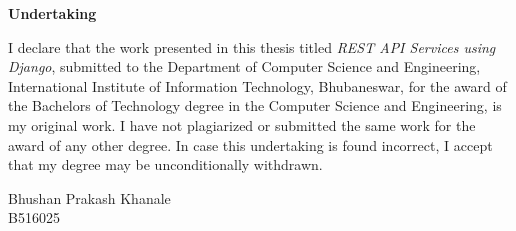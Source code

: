\centerline{\Large{\bf Undertaking}}
\vspace{1cm}

\noindent
I declare that the work presented in this thesis titled
\textit{REST API Services using Django}, submitted to the Department of
Computer Science and Engineering, International Institute of Information
Technology, Bhubaneswar, for the award of the Bachelors of Technology degree
in the Computer Science and Engineering, is my original work. I have not
plagiarized or submitted the same work for the award of any other degree.
In case this undertaking is found incorrect, I accept that my degree may be
unconditionally withdrawn.

\vspace*{0.5in}
\begin{flushright}
Bhushan Prakash Khanale\\
B516025
\end{flushright}
